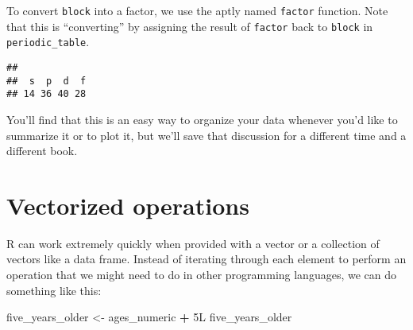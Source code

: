 \documentclass[]{tufte-book}
\newenvironment{Shaded}{\begin{snugshade}}{\end{snugshade}}
\newcommand{\DataTypeTok}[1]{\textcolor[rgb]{0.13,0.29,0.53}{#1}}
\newcommand{\KeywordTok}[1]{\textcolor[rgb]{0.13,0.29,0.53}{\textbf{#1}}}
\newcommand{\NormalTok}[1]{#1}
\newcommand{\OperatorTok}[1]{\textcolor[rgb]{0.81,0.36,0.00}{\textbf{#1}}}
\newcommand{\StringTok}[1]{\textcolor[rgb]{0.31,0.60,0.02}{#1}}
\begin{document}
To convert \texttt{block} into a factor, we use the aptly named \texttt{factor} function. Note that this is ``converting'' by assigning the result of \texttt{factor} back to \texttt{block} in \texttt{periodic\_table}.

\begin{Shaded}
\end{Shaded}

\begin{Shaded}
\end{Shaded}

\begin{verbatim}
## 
##  s  p  d  f 
## 14 36 40 28
\end{verbatim}

You'll find that this is an easy way to organize your data whenever you'd like to summarize it or to plot it, but we'll save that discussion for a different time and a different book.

\hypertarget{vectorized-operations}{%
\section{Vectorized operations}\label{vectorized-operations}}

R can work extremely quickly when provided with a vector or a collection of vectors like a data frame. Instead of iterating through each element to perform an operation that we might need to do in other programming languages, we can do something like this:

\begin{Shaded}
\begin{Highlighting}[]
\NormalTok{five_years_older <-}\StringTok{ }\NormalTok{ages_numeric }\OperatorTok{+}\StringTok{ }\NormalTok{5L}
\NormalTok{five_years_older}
\end{Highlighting}
\end{Shaded}
\end{document}

